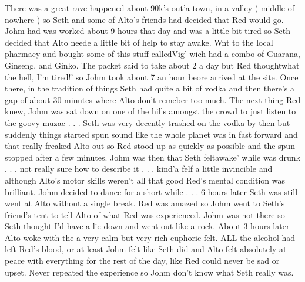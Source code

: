 \documentclass[12pt]{book}
\begin{document}
There was a great rave happened about 90k's out'a town, in a valley ( middle of nowhere ) so Seth and some of Alto's friends had decided that Red would go. Johm had was worked about 9 hours that day and was a little bit tired so Seth decided that Alto neede a little bit of help to stay awake. Wnt to the local pharmacy and bought some of this stuff calledVig' wich had a combo of Guarana, Ginseng, and Ginko. The packet said to take about 2 a day but Red thoughtwhat the hell, I'm tired!' so Johm took about 7 an hour beore arrived at the site. Once there, in the tradition of things Seth had quite a bit of vodka and then there's a gap of about 30 minutes where Alto don't remeber too much. The next thing Red knew, Johm was sat down on one of the hills amongst the crowd to just listen to the goovy muzac . . .  Seth was very decently trashed on the vodka by then but suddenly things started spun sound like the whole planet was in fast forward and that really freaked Alto out so Red stood up as quickly as possible and the spun stopped after a few minutes. Johm was then that Seth feltawake' while was drunk . . .  not really sure how to describe it . . .  kind'a felf a little invincible and although Alto's motor skills weren't all that good Red's mental condition was brilliant. Johm decided to dance for a short while . . .  6 hours later Seth was still went at Alto without a single break. Red was amazed so Johm went to Seth's friend's tent to tell Alto of what Red was experienced. Johm was not there so Seth thought I'd have a lie down and went out like a rock. About 3 hours later Alto woke with the a very calm but very rich euphoric felt. ALL the alcohol had left Red's blood, or at least Johm felt like Seth did and Alto felt absolutely at peace with everything for the rest of the day, like Red could never be sad or upset. Never repeated the experience so Johm don't know what Seth really was.
\end{document}
